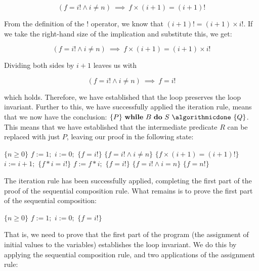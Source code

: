 \begin{example}
\begin{displaymath}
(f = i! \land i \neq n) ~\implies~ f \times (i + 1) = (i + 1)!
\end{displaymath}

From the definition of the $!$ operator, we know that $(i + 1)! = (i + 1) \times i!$. If we take the right-hand size of the implication and substitute this, we get:

\begin{displaymath}
(f = i! \land i \neq n) ~\implies~ f \times (i + 1) = (i + 1) \times i!
\end{displaymath}

Dividing both sides by $i + 1$ leaves us with

\begin{displaymath}
(f = i! \land i \neq n) ~\implies~ f  = i!
\end{displaymath}

which holds. Therefore, we have established that the loop preserves the loop invariant. Further to this, we have successfully applied the iteration rule, means that we now have the conclusion: $\{P\} ~\algorithmicwhile~B~\algorithmicdo~S~\algorithmicdone~ \{Q\}$. This means that we have established that the intermediate predicate $R$ can be replaced with just $P$, leaving our proof in the following state:

\begin{algorithmic}[1]
\State $\{n \geq 0\}$
\State $f := 1;$
\State $i := 0;$
\State $\{f = i!\}$
  \State $\{f = i! \land i \neq n\}$
  \State $\{f \times (i + 1) = (i + 1)!\}$
  \State $i := i + 1;$
  \State $\{f * i = i!\}$
  \State $f := f * i;$
  \State $\{f = i!\}$
\EndWhile
\State $\{f = i! \land i = n\}$ 
\State $\{f = n!\}$  
\end{algorithmic}

The iteration rule has been successfully applied, completing the first part of the proof of the sequential composition rule. What remains is to prove the first part of the sequential composition:

\begin{algorithmic}[0]
\State $\{n \geq 0\}$
\State $f := 1;$
\State $i := 0;$
\State $\{f = i!\}$
\end{algorithmic}

That is, we need to prove that the first part of the program (the assignment of initial values to the variables) establishes the loop invariant. We do this by applying the sequential composition rule, and two applications of the assignment rule:


\end{example}
